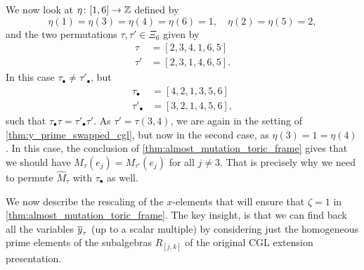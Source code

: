 \begin{example}
	We now look at $\eta \colon [1,6] \to \mathbb{Z}$ defined by
	\begin{equation*}
		\eta(1) = \eta(3) = \eta(4) = \eta(6) = 1, \quad \eta(2) = \eta(5) = 2,
	\end{equation*}
	and the two permutations $\tau, \tau' \in \Xi_6$ given by
	\begin{align*}
		\tau  & = [2,3,4,1,6,5]  \\
		\tau' & = [2,3,1,4,6,5].
	\end{align*}
	In this case $\tau_\bullet \neq \tau'_\bullet$, but
	\begin{align*}
		\tau_\bullet  & = [4,2,1,3,5,6]  \\
		\tau'_\bullet & = [3,2,1,4,5,6],
	\end{align*}
	such that $\tau_\bullet \tau = \tau'_\bullet \tau'$. As $\tau' = \tau (3,4)$, we are
	again in the setting of \cref{thm:y_prime_swapped_cgl}, but now in the second case, as
	$\eta(3) = 1 = \eta(4)$. In this case, the conclusion of
	\cref{thm:almost_mutation_toric_frame} gives that we should have $M_\tau (e_j) =
		M_{\tau'}(e_j)$ for all $j \neq 3$. That is precisely why we need to permute
	$\widehat{M}_\tau$ with $\tau_\bullet$ as well.
\end{example}

We now describe the rescaling of the $x$-elements that will ensure that $\zeta = 1$ in
\cref{thm:almost_mutation_toric_frame}. The key insight, is that we can find back all
the variables $\overline{y}_{\tau}$ (up to a scalar multiple) by considering just the
homogeneous prime elements of the subalgebras $R_{[j, k]}$ of the original CGL
extension presentation.

